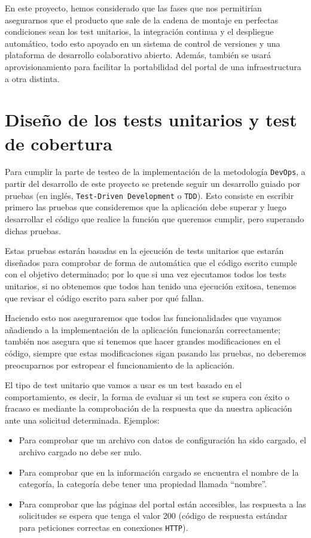 \bigskip
En este proyecto, hemos considerado que las fases que nos permitirían asegurarnos que el producto que sale de la cadena de montaje en perfectas condiciones sean los test unitarios, la integración continua y el despliegue automático, todo esto apoyado en un sistema de control de versiones y una plataforma de desarrollo colaborativo abierto. Además, también se usará aprovisionamiento para facilitar la portabilidad del portal de una infraestructura a otra distinta. 

\section{Diseño de los tests unitarios y test de cobertura}

Para cumplir la parte de testeo de la implementación de la metodología {\tt DevOps}, a partir del desarrollo de este proyecto se pretende seguir un desarrollo guiado por pruebas (en inglés, {\tt Test-Driven Development} o {\tt TDD}). Esto consiste en escribir primero las pruebas que consideremos que la aplicación debe superar y luego desarrollar el código que realice la función que queremos cumplir, pero superando dichas pruebas. 

\bigskip
Estas pruebas estarán basadas en la ejecución de tests unitarios que estarán diseñados para comprobar de forma de automática que el código escrito cumple con el objetivo determinado; por lo que si una vez ejecutamos todos los tests unitarios, si no obtenemos que todos han tenido una ejecución exitosa, tenemos que revisar el código escrito para saber por qué fallan.

\bigskip
Haciendo esto nos aseguraremos que todos las funcionalidades que vayamos añadiendo a la implementación de la aplicación funcionarán correctamente; también nos asegura que si tenemos que hacer grandes modificaciones en el código, siempre que estas modificaciones sigan pasando las pruebas, no deberemos preocuparnos por estropear el funcionamiento de la aplicación.

\bigskip
El tipo de test unitario que vamos a usar es un test basado en el comportamiento, es decir, la forma de evaluar si un test se supera con éxito o fracaso es mediante la comprobación de la respuesta que da nuestra aplicación ante una solicitud 
determinada. Ejemplos:

\begin{itemize}
 \item Para comprobar que un archivo con datos de configuración ha sido cargado, el archivo cargado no debe ser nulo.
 \item Para comprobar que en la información cargado se encuentra el nombre de la categoría, la categoría debe tener una propiedad llamada ``nombre''.
 \item Para comprobar que las páginas del portal están accesibles, las respuesta a las solicitudes se espera que tenga el valor 200 (código de respuesta estándar para peticiones correctas en conexiones {\tt HTTP}).
\end{itemize}

